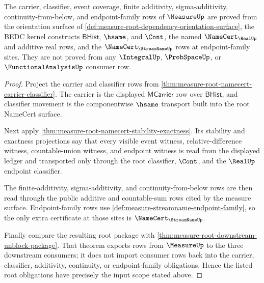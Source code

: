\begin{theorem}
\label{thm:measure-root-input-dependency-scope}
The carrier, classifier, event coverage, finite additivity,
sigma-additivity, continuity-from-below, and endpoint-family rows of
$\MeasureUp$ are proved from the orientation surface of
\autoref{def:measure-root-dependency-orientation-surface}, the BEDC kernel
constructs $\mathsf{BHist}$, $\hsame$, and $\Cont$, the named
$\NameCert_{\RealUp}$ and additive real rows, and the
$\NameCert_{\StreamNameUp}$ rows at endpoint-family sites. They are not
proved from any $\IntegralUp$, $\ProbSpaceUp$, or $\FunctionalAnalysisUp$
consumer row.
\end{theorem}
\begin{proof}
Project the carrier and classifier rows from
\autoref{thm:measure-root-namecert-carrier-classifier}. The carrier is the
displayed $\mathsf{MCarrier}$ row over $\mathsf{BHist}$, and classifier
movement is the componentwise $\hsame$ transport built into the root
NameCert surface.

Next apply \autoref{thm:measure-root-namecert-stability-exactness}. Its
stability and exactness projections say that every visible event witness,
relative-difference witness, countable-union witness, and endpoint witness is
read from the displayed ledger and transported only through the root
classifier, $\Cont$, and the $\RealUp$ endpoint classifier.

The finite-additivity, sigma-additivity, and continuity-from-below rows are
then read through the public additive and countable-sum rows cited by the
measure surface. Endpoint-family rows use
\autoref{def:measure-streamname-endpoint-family}, so the only extra
certificate at those sites is $\NameCert_{\StreamNameUp}$.

Finally compare the resulting root package with
\autoref{thm:measure-root-downstream-unblock-package}. That theorem exports
rows from $\MeasureUp$ to the three downstream consumers; it does not import
consumer rows back into the carrier, classifier, additivity, continuity, or
endpoint-family obligations. Hence the listed root obligations have precisely
the input scope stated above.
\end{proof}

